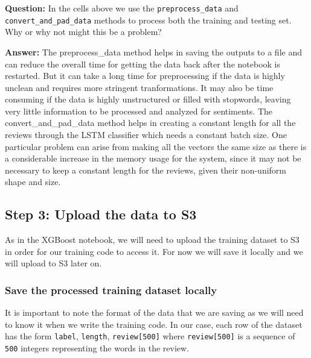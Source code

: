 \documentclass[11pt]{article}
\begin{document}
    \textbf{Question:} In the cells above we use the
\texttt{preprocess\_data} and \texttt{convert\_and\_pad\_data} methods
to process both the training and testing set. Why or why not might this
be a problem?

    \textbf{Answer:} The preprocess\_data method helps in saving the outputs
to a file and can reduce the overall time for getting the data back
after the notebook is restarted. But it can take a long time for
preprocessing if the data is highly unclean and requires more stringent
tranformations. It may also be time consuming if the data is highly
unstructured or filled with stopwords, leaving very little information
to be processed and analyzed for sentiments. The convert\_and\_pad\_data
method helps in creating a constant length for all the reviews through
the LSTM classifier which needs a constant batch size. One particular
problem can arise from making all the vectors the same size as there is
a considerable increase in the memory usage for the system, since it may
not be necessary to keep a constant length for the reviews, given their
non-uniform shape and size.

    \hypertarget{step-3-upload-the-data-to-s3}{%
\subsection{Step 3: Upload the data to
S3}\label{step-3-upload-the-data-to-s3}}

As in the XGBoost notebook, we will need to upload the training dataset
to S3 in order for our training code to access it. For now we will save
it locally and we will upload to S3 later on.

\hypertarget{save-the-processed-training-dataset-locally}{%
\subsubsection{Save the processed training dataset
locally}\label{save-the-processed-training-dataset-locally}}

It is important to note the format of the data that we are saving as we
will need to know it when we write the training code. In our case, each
row of the dataset has the form \texttt{label}, \texttt{length},
\texttt{review{[}500{]}} where \texttt{review{[}500{]}} is a sequence of
\texttt{500} integers representing the words in the review.
\end{document}

